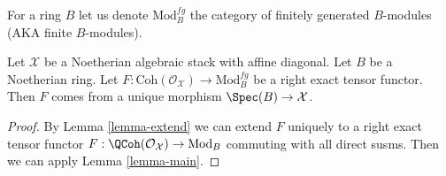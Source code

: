 \noindent
For a ring $B$ let us denote $\text{Mod}^{fg}_B$ the category of
finitely generated $B$-modules (AKA finite $B$-modules).

\begin{theorem}
\label{theorem-main}
Let $\mathcal{X}$ be a Noetherian algebraic stack with affine diagonal.
Let $B$ be a Noetherian ring.
Let $F : \text{Coh}(\mathcal{O}_\mathcal{X}) \to \text{Mod}^{fg}_B$
be a right exact tensor functor.
Then $F$ comes from a unique morphism $\Spec(B) \to \mathcal{X}$.
\end{theorem}

\begin{proof}
By Lemma \ref{lemma-extend}
we can extend $F$ uniquely to a right exact tensor functor
$F : \QCoh(\mathcal{O}_\mathcal{X}) \to \text{Mod}_B$
commuting with all direct susms. Then we can apply
Lemma \ref{lemma-main}.
\end{proof}
















